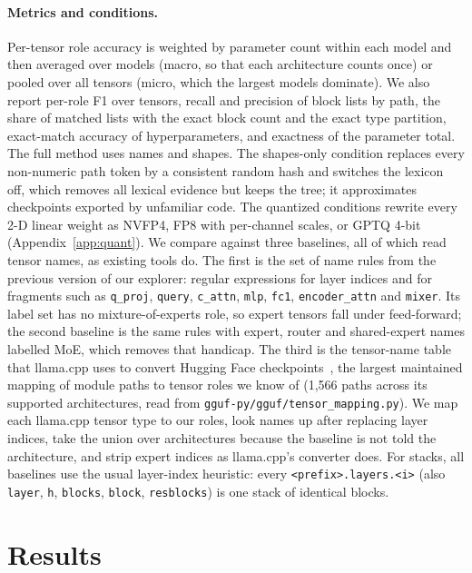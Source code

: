 \documentclass[11pt]{article}
\newcommand{\tn}[1]{\texttt{#1}}
\begin{document}
\paragraph{Metrics and conditions.} Per-tensor role accuracy is weighted by parameter count within each model and then averaged over models (macro, so that each architecture counts once) or pooled over all tensors (micro, which the largest models dominate). We also report per-role F1 over tensors, recall and precision of block lists by path, the share of matched lists with the exact block count and the exact type partition, exact-match accuracy of hyperparameters, and exactness of the parameter total. The full method uses names and shapes. The shapes-only condition replaces every non-numeric path token by a consistent random hash and switches the lexicon off, which removes all lexical evidence but keeps the tree; it approximates checkpoints exported by unfamiliar code. The quantized conditions rewrite every 2-D linear weight as NVFP4, FP8 with per-channel scales, or GPTQ 4-bit (Appendix~\ref{app:quant}). We compare against three baselines, all of which read tensor names, as existing tools do. The first is the set of name rules from the previous version of our explorer: regular expressions for layer indices and for fragments such as \tn{q\_proj}, \tn{query}, \tn{c\_attn}, \tn{mlp}, \tn{fc1}, \tn{encoder\_attn} and \tn{mixer}. Its label set has no mixture-of-experts role, so expert tensors fall under feed-forward; the second baseline is the same rules with expert, router and shared-expert names labelled MoE, which removes that handicap. The third is the tensor-name table that llama.cpp uses to convert Hugging Face checkpoints~\citep{llamacpp}, the largest maintained mapping of module paths to tensor roles we know of (1{,}566 paths across its supported architectures, read from \tn{gguf-py/gguf/tensor\_mapping.py}). We map each llama.cpp tensor type to our roles, look names up after replacing layer indices, take the union over architectures because the baseline is not told the architecture, and strip expert indices as llama.cpp's converter does. For stacks, all baselines use the usual layer-index heuristic: every \tn{<prefix>.layers.<i>} (also \tn{layer}, \tn{h}, \tn{blocks}, \tn{block}, \tn{resblocks}) is one stack of identical blocks.

\section{Results}
\label{sec:results}
\end{document}
